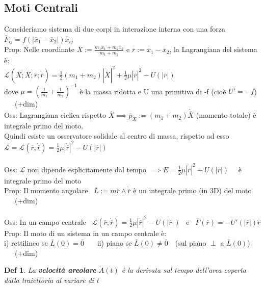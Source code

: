 \documentclass{article}
\theoremstyle{unnumbered}
\newtheorem* {theoremT}{Def}
\theoremstyle{unnumbered1}
\newenvironment{defi}{\begin{gBox}\begin{theoremT}}{\end{theoremT}\end{gBox}}
\begin{document}
\subsection{Moti Centrali}
%
Consideriamo sistema di due corpi in interazione interna con una forza \ \ $\overline{F}_{ij}=f(|\overline{x}_1-\overline{x}_2|)\hat{x}_{ij}$\\
Prop: Nelle coordinate $\overline{X}:=\frac{m_1\overline{x}_1+m_2\overline{x}_2}{m_1+m_2}$ e $\overline{r}:=\overline{x}_1-\overline{x}_2$, la Lagrangiana del sistema è: \\
\phantom{Prop: }$\mathcal{L}(\overline{X};\dot{\overline{X}};\overline{r};\dot{\overline{r}})=\frac{1}{2}(m_1+m_2)|\dot{\overline{X}}|^2+\frac{1}{2}\mu|\dot{\overline{r}}|^2 -U(|\overline{r}|)$ \\
\phantom{Prop: }dove $\mu=(\frac{1}{m_1}+\frac{1}{m_2})^{-1}$ è la massa ridotta e U una primitiva di -f (cioè $U'=-f$) \ \ \ (+dim)\\
%
Oss: Lagrangiana ciclica rispetto $\overline{X} \implies \overline{p}_X:=(m_1+m_2)\dot{\overline{X}}$ (momento totale) è integrale primo del moto.\\ \phantom{Oss: }Quindi esiste un osservatore solidale al centro di massa, rispetto ad esso $\mathcal{L}=\mathcal{L}(\overline{r};\dot{\overline{r}})=\frac{1}{2}\mu|\Dot{\overline{r}}|^2 - U(|\overline{r}|)$ \\ \\ 
%
%
%
%
Oss: $\mathcal{L}$ non dipende esplicitamente dal tempo $\implies E=\frac{1}{2}\mu|\Dot{\overline{r}}|^2 + U(|\overline{r}|)$ \ \ è integrale primo del moto \\
%
Prop: Il momento angolare \ $\overline{L}:=m\overline{r}\wedge\Dot{\overline{r}}$ è un integrale primo (in 3D) del moto \ \ \ (+dim)\\ \\
%
%
%
Oss: In un campo centrale \ $\mathcal{L}(\overline{r};\Dot{\overline{r}})=\frac{1}{2}\mu|\Dot{\overline{r}}|^2 -U(|\overline{r}|)$  \ e \ $\overline{F}(\overline{r})=-U'(|\overline{r}|)\hat{r}$\\
%
Prop: Il moto di un sistema in un campo centrale è: \\
\phantom{Prop: }i) rettilineo se $\overline{L}(0)=\overline{0}$ \ \ \ ii) piano se $\overline{L}(0)\neq \overline{0}$\ \ (sul piano $\perp$ a $\overline{L}(0)$) \ \ \ (+dim)\\
%
%
%
\begin{defi}
La \textbf{velocità areolare} $\Dot{A}(t)$ è la derivata sul tempo dell'area coperta dalla traiettoria al variare di t
\end{defi}
\end{document}
